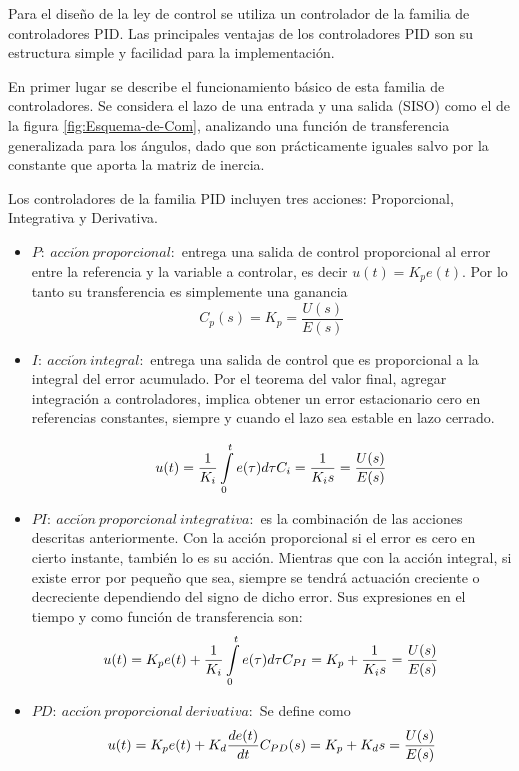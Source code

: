 \documentclass[../main.tex]{subfiles}
\begin{document}
Para el diseño de la ley de control se utiliza un controlador de la
familia de controladores PID. Las principales ventajas de los controladores
PID son su estructura simple y facilidad para la implementación. 

En primer lugar se describe el funcionamiento básico de esta familia
de controladores. Se considera el lazo de una entrada y una salida
(SISO) como el de la figura \ref{fig:Esquema-de-Com}, analizando una función
de transferencia generalizada para los ángulos, dado que son prácticamente
iguales salvo por la constante que aporta la matriz de inercia. 

Los controladores de la familia PID incluyen tres acciones: Proporcional,
Integrativa y Derivativa. 

\begin{itemize}
\item $P:\ acci\acute{o}n\ proporcional:$ entrega una salida de control
proporcional al error entre la referencia y la variable a controlar,
es decir $u(t)=K_{p}e(t)$. Por lo tanto su transferencia es simplemente
una ganancia 
\[
C_{p}(s)=K_{p}=\frac{U(s)}{E(s)}
\]
\end{itemize}

\begin{itemize}
\item $I:\ acci\acute{o}n\ integral:$ entrega una salida de control que
es proporcional a la integral del error acumulado. Por el teorema
del valor final, agregar integración a controladores, implica obtener
un error estacionario cero en referencias constantes, siempre y cuando el lazo sea estable en lazo cerrado.

\[
u(t)=\frac{1}{K_{i}}\intop_{0}^{t}e(\tau)d\tau\hfill C_{i}=\frac{1}{K_{i}s}=\frac{U(s)}{E(s)}
\]

\item $PI:\ acci\acute{o}n\ proporcional\ integrativa:$ es la combinación
de las acciones descritas anteriormente. Con la acción proporcional
si el error es cero en cierto instante, también lo es su acción. Mientras
que con la acción integral, si existe error por pequeño que sea, siempre
se tendrá actuación creciente o decreciente dependiendo del signo
de dicho error. Sus expresiones en el tiempo y como función de transferencia
son:
\[
u(t)=K_{p}e(t)+\frac{1}{K_{i}}\intop_{0}^{t}e(\tau)d\tau\hfill C_{PI}=K_{p}+\frac{1}{K_{i}s}=\frac{U(s)}{E(s)}
\]
\end{itemize}

 
\begin{itemize}
\item $PD:\ acci\acute{o}n\ proporcional\ derivativa:$ Se define como 
\[
u(t)=K_{p}e(t)+K_{d}\frac{de(t)}{dt}\hfill C_{PD}(s)=K_{p}+K_{d}s=\frac{U(s)}{E(s)}
\]
\end{itemize}
\end{document}
